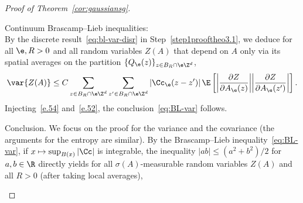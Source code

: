 \begin{proof}[Proof of Theorem~\ref{cor:gaussiansg}]
\begin{step}{Continuum Brascamp--Lieb inequalities:}
\begin{equation}
\end{equation}
By the discrete result~\eqref{eq:bl-var-disr} in Step~\ref{step1prooftheo3.1}, we deduce for all $\e,R>0$ and all random variables $Z(A)$ that depend on $A$ only via its spatial averages on the partition $\{Q_\e(z)\}_{z\in B_R\cap\e\Z^d}$,
\[
\var{Z(A)}\le C\sum_{z\in B_R\cap\e\Z^d}\sum_{z'\in B_R\cap\e\Z^d}|\Cc_\e(z-z')|\,\E\left[\left|\frac{\partial Z}{\partial A_\e(z)}\bigg|\bigg|\frac{\partial Z}{\partial A_\e(z')}\right|\right].
\]
Injecting~\eqref{e.54} and~\eqref{e.52}, the conclusion~\eqref{eq:BL-var} follows.
\end{step}


\begin{step}{Conclusion.}\label{step3prooftheo3.1}
We focus on the proof for the variance and the covariance (the arguments for the entropy are similar). By the Brascamp--Lieb inequality~\eqref{eq:BL-var}, if $x\mapsto \sup_{B(x)}|\Cc|$ is integrable, the inequality $|ab|\le (a^2+b^2)/2$ for $a,b\in\R$ directly yields for all $\sigma(A)$-measurable random variables $Z(A)$ and all $R>0$ (after taking local averages),


\end{step}
\end{proof}
